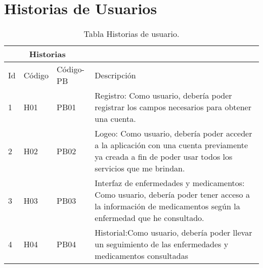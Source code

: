 \chapter{Historias de Usuarios}


\begin{table}[htb]
	\centering
	\begin{tabular}{|l|p{2.5cm}|p{1.5cm}|p{10cm}|}
		\hline
		\multicolumn{3}{|c|}{Historias} \\ \hline
		Id & Código& Código-PB & Descripción \\
		\hline \hline
		1 & H01 & PB01 & Registro: Como usuario, debería poder registrar los campos necesarios para obtener una cuenta.\\ \hline
		
		2 & H02 & PB02 & Logeo: Como usuario, debería poder acceder a la aplicación con una cuenta previamente ya creada a fin de poder usar todos los servicios que me brindan.  \\ \hline
		
		3 & H03 & PB03 & Interfaz de enfermedades y medicamentos: 
		Como usuario, debería poder tener acceso a la información de medicamentos según la enfermedad que he consultado.   \\ \hline
		
		4 & H04 & PB04 & Historial:Como usuario, debería poder llevar un seguimiento de las enfermedades y medicamentos consultadas \\ \hline
		
	
		
		
	
	\end{tabular}
	\caption{Tabla Historias de usuario.}
	\label{tabla:Historial}
\end{table}